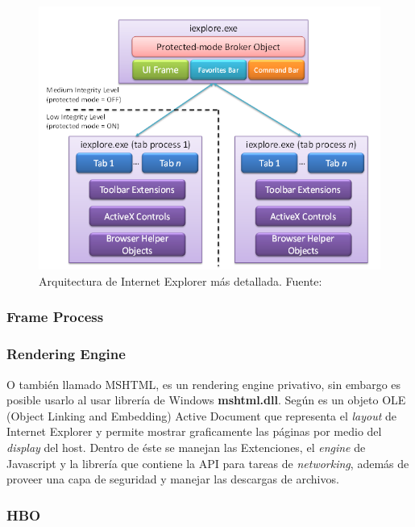     \begin{figure}[h!t]
        \centering
        \includegraphics[scale=0.5]{figures/11_IE8andLooselyCoupledIELCIE_2.png}
        \caption{Arquitectura de Internet Explorer más detallada. Fuente: \cite{IE8LCIE}}
        \label{fig:archIE2}
    \end{figure}

        \subsubsection{Frame Process}

   
        \subsubsection{Rendering Engine}   
        \label{chap2:Trident}
        O también llamado MSHTML, es un rendering engine privativo, sin embargo es posible usarlo al usar librería de Windows \textbf{mshtml.dll}. Según \cite{Crowley2010} es un objeto OLE (Object Linking and Embedding) Active Document que representa el \textit{layout} de Internet Explorer y permite mostrar graficamente las páginas por medio del \textit{display} del host. Dentro de éste se manejan las Extenciones, el \textit{engine} de Javascript y la librería que contiene la API para tareas de \textit{networking}, además de proveer una capa de seguridad y manejar las descargas de archivos.

        \subsubsection{HBO}

